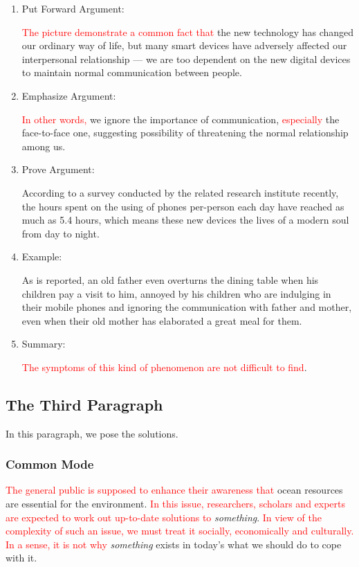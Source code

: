 \documentclass{article}
\begin{document}
\begin{enumerate}
\item Put Forward Argument:
  \par \textcolor{red}{The picture demonstrate a common fact that }the new technology has
  changed our ordinary way of life, but many smart devices have adversely affected our
  interpersonal relationship --- we are too dependent on the new digital devices to maintain
  normal communication between people.
  
\item Emphasize Argument:
  \par \textcolor{red}{In other words, }we ignore the importance of communication,
  \textcolor{red}{especially }the face-to-face one, suggesting possibility of threatening the
  normal relationship among us.

\item Prove Argument:
  \par According to a survey conducted by the related research institute recently, the
  hours spent on the using of phones per-person each day have reached as much as 5.4
  hours, which means these new devices the lives of a modern soul from day to night.

\item Example:
  \par As is reported, an old father even overturns the dining table when his children pay
  a visit to him, annoyed by his children who are indulging in their mobile phones and
  ignoring the communication with father and mother, even when their old mother has
  elaborated a great meal for them.

\item Summary:
  \par \textcolor{red}{The symptoms of this kind of phenomenon are not difficult to find}.
\end{enumerate}

\subsection{The Third Paragraph}
\label{sec:third-paragraph}

In this paragraph, we pose the solutions.

\subsubsection{Common Mode}
\label{sec:common-mode}

\hspace{0.4cm} \textcolor{red}{The general public is supposed to enhance their awareness that} ocean resources are
essential for the environment. \textcolor{red}{In this issue, researchers, scholars and experts are
expected to work out up-to-date solutions to} \emph{something}. \textcolor{red}{In view of
the complexity of such an issue, we must treat it socially, economically and
culturally. In a sense, it is not why } \emph {something} exists in today's what we should
do to cope with it.
\end{document}
